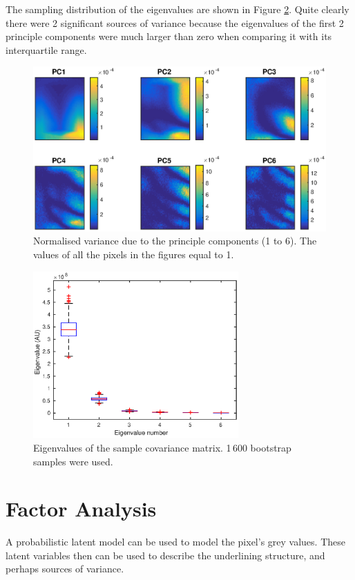 \documentclass[12pt]{report}
\begin{document}
The sampling distribution of the eigenvalues are shown in Figure \ref{fig:initial_PC_eigenvalues}. Quite clearly there were 2 significant sources of variance because the eigenvalues of the first 2 principle components were much larger than zero when comparing it with its interquartile range.

\begin{figure}
	\includegraphics[width=\textwidth]{figures/initial_PCvariance.eps}
	\caption{Normalised variance due to the principle components (1 to 6). The values of all the pixels in the figures equal to 1.}
	\label{fig:initial_PCvariance}
\end{figure}
\begin{figure}
	\centering
	\includegraphics[width=0.7\textwidth]{figures/initial_PC_eigenvalues.eps}
	\caption{Eigenvalues of the sample covariance matrix. 1\,600 bootstrap samples were used.}
	\label{fig:initial_PC_eigenvalues}
\end{figure}

\section{Factor Analysis}
A probabilistic latent model can be used to model the pixel's grey values. These latent variables then can be used to describe the underlining structure, and perhaps sources of variance.
\end{document}
